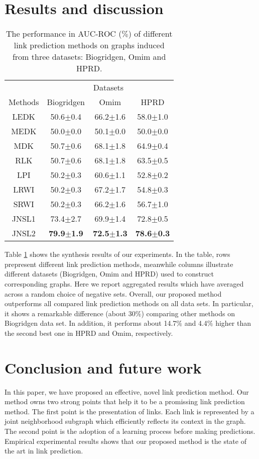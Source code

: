 \documentclass{article}
\begin{document}
\section{Results and discussion}
\label{result-discussion}
\begin{table}[H]
  \caption{The performance in AUC-ROC ($\%$) of different link prediction methods on graphs induced from three datasets: Biogridgen, Omim and HPRD.}
  \label{table-result}
  \centering
  \begin{tabular}{c c c c}
    \hline
     & \multicolumn{3}{c}{Datasets} \\
    \cmidrule{2-4}
	 Methods & Biogridgen & Omim & HPRD \\
	\hline
	LEDK & 50.6$\pm$0.4 & 66.2$\pm$1.6 & 58.0$\pm$1.0 \\
	MEDK & 50.0$\pm$0.0 & 50.1$\pm$0.0 & 50.0$\pm$0.0 \\
	MDK & 50.7$\pm$0.6 & 68.1$\pm$1.8 & 64.9$\pm$0.4 \\
	RLK & 50.7$\pm$0.6 & 68.1$\pm$1.8	& 63.5$\pm$0.5 \\
	LPI & 50.2$\pm$0.3 & 60.6$\pm$1.1	& 52.8$\pm$0.2 \\
	LRWI & 50.2$\pm$0.3 & 67.2$\pm$1.7	& 54.8$\pm$0.3 \\
	SRWI & 50.2$\pm$0.3 & 66.2$\pm$1.6	& 56.7$\pm$1.0 \\
	JNSL1 & 73.4$\pm$2.7 & 69.9$\pm$1.4	& 72.8$\pm$0.5 \\
	JNSL2 & \textbf{79.9$\pm$1.9} & \textbf{72.5$\pm$1.3}	& \textbf{78.6$\pm$0.3} \\
\hline
  \end{tabular}
\end{table}
Table \ref{table-result} shows the synthesis results of our experiments. In the table, rows prepresent different link prediction methods, meanwhile columns illustrate different datasets (Biogridgen, Omim and HPRD) used to construct corresponding graphs. Here we report aggregated results which have averaged across a random choice of negative sets. Overall, our proposed method outperforms all compared link prediction methods on all data sets. In particular, it shows a remarkable difference (about 30$\%$) comparing other methods on Biogridgen data set. In addition, it performs about 14.7$\%$ and 4.4$\%$ higher than the second best one in HPRD and Omim, respectively. 

\section{Conclusion and future work}
\label{conclusion-futurework}
In this paper, we have proposed an effective, novel link prediction method. Our method owns two strong points that help it to be a promissing link prediction method. The first point is the presentation of links. Each link is represented by a joint neighborhood subgraph which efficiently reflects its context in the graph. The second point is the adoption of a learning process before making predictions. Empirical experimental results shows that our proposed method is the state of the art in link prediction.
\end{document}
